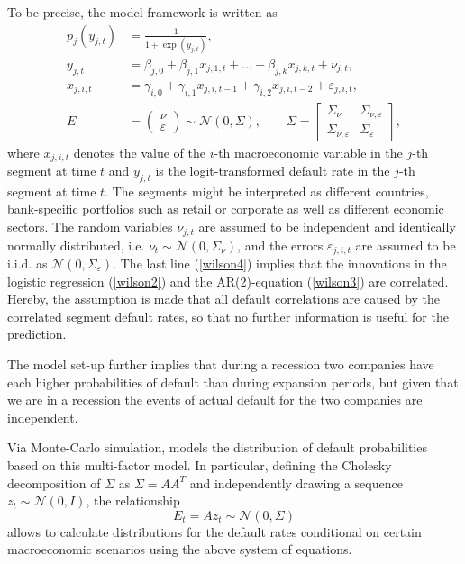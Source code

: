 \documentclass[a4paper, 11pt]{scrreprt}
\begin{document}
To be precise, the \textcite{wilson1997wilsonI} model framework is written as
\begin{align}
p_j(y_{j,t}) &= \frac{1}{1+\exp(y_{j,t})}, \label{wilson1}\\
y_{j,t} &=  \beta_{j,0} + \beta_{j,1} x_{j,1,t} + \ldots + \beta_{j,k} x_{j,k,t} + \nu_{j,t}, \label{wilson2} \\
x_{j,i,t} &= \gamma_{i,0} + \gamma_{i,1} x_{j,i,t-1} + \gamma_{i,2} x_{j,i,t-2} + \varepsilon_{j,i,t}, \label{wilson3} \\
E &= \begin{pmatrix} \nu \\ \varepsilon \end{pmatrix}
 \sim \mathcal{N}(0, \Sigma), \qquad \Sigma = \begin{bmatrix} \Sigma_\nu & \Sigma_{\nu,\varepsilon} \\ \Sigma_{\nu,\varepsilon} & \Sigma_\varepsilon \end{bmatrix}, \label{wilson4}
\end{align}
where $x_{j,i,t}$ denotes the value of the $i$-th macroeconomic variable in the $j$-th segment at time $t$ and $y_{j,t}$ is the logit-transformed default rate in the $j$-th segment at time $t$. 
The segments might be interpreted as different countries, bank-specific portfolios such as retail or corporate as well as different economic sectors.
The random variables $\nu_{j,t}$ are assumed to be independent and identically normally distributed, i.e. $\nu_t \sim \mathcal{N}(0, \Sigma_\nu)$, and the errors $\varepsilon_{j,i,t}$ are assumed to be i.i.d. as $\mathcal{N}(0, \Sigma_\varepsilon)$.
The last line (\ref{wilson4}) implies that the innovations in the logistic regression (\ref{wilson2}) and the AR(2)-equation (\ref{wilson3}) are correlated.
Hereby, the assumption is made that all default correlations are caused by the correlated  segment default rates, so that no further information is useful for the prediction.

The model set-up further implies that during a recession two companies have each higher probabilities of default than during expansion periods, but given that we are in a recession the events of actual default for the two companies are independent.

Via Monte-Carlo simulation, \textcite{wilson1997wilsonII} models the distribution of default probabilities based on this multi-factor model. In particular, defining the Cholesky decomposition of $\Sigma$ as $\Sigma = AA^T$ and independently drawing a sequence $z_t \sim \mathcal{N}(0, I)$, the relationship
\[ E_t = A z_t \sim \mathcal{N}(0, \Sigma) \]
allows to calculate distributions for the default rates conditional on certain macroeconomic scenarios using the above system of equations.
\end{document}
